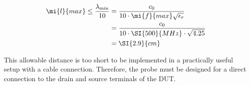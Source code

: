\begin{align}
    \mi{l}{max} \leq \frac{\lambda_\mathrm{min}}{10} &= \frac{c_0}{10\cdot\mi{f}{max}\sqrt{\epsilon_r}} \\
                                                    &= \frac{c_0}{10\cdot \SI{500}{MHz}\cdot \sqrt{4.25}} \\
                                                    &= \SI{2.9}{cm}
\end{align}

This allowable distance is too short to be implemented in a practically useful setup with a cable connection.
Therefore, the probe must be designed for a direct connection to the drain and source terminals of the DUT.